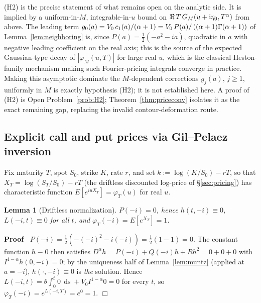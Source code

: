 \documentclass{article}
\newcommand{\assign}{:=}
\newcommand{\tmem}[1]{{\em #1\/}}
\newcommand{\tmop}[1]{\ensuremath{\operatorname{#1}}}
\newcommand{\tmtextup}[1]{\text{{\upshape{#1}}}}
\newenvironment{proof}{\noindent\textbf{Proof\ }}{\hspace*{\fill}$\Box$\medskip}
\newtheorem{lemma}{Lemma}
{\theorembodyfont{\rmfamily\small}\newtheorem{problem}{Problem}}
\begin{document}
\begin{remark}
  [Status of \tmtextup{(H2)}]\label{rem:H2} (H2) is the precise statement of
  what remains open on the analytic side. It is implied by a uniform-in-$M$,
  integrable-in-$u$ bound on $\Re \hspace{0.17em} T \hspace{0.17em} G_M (u +
  \mathrm{i} \eta_0, T^{\alpha})$ from above. The leading term $g_0 (a) = V_0
  \hspace{0.17em} c_1 (a) / (\alpha + 1) = V_0  \hspace{0.17em} P (a) /
  \left( (\alpha + 1) \Gamma (\alpha + 1) \right)$ of
  Lemma~\ref{lem:neighboring} is, since $P (a) = \tfrac{1}{2} (- a^2 - ia)$,
  quadratic in $a$ with negative leading coefficient on the real axis; this
  is the source of the expected Gaussian-type decay of $| \varphi_M (u, T) |$
  for large real $u$, which is the classical Heston-family mechanism making
  such Fourier-pricing integrals converge in practice. Making this
  asymptotic dominate the $M$-dependent corrections $g_j (a)$, $j \ge 1$,
  uniformly in $M$ is exactly hypothesis (H2); it is not established here.
  A proof of (H2) is Open Problem~\ref{prob:H2}; Theorem~\ref{thm:priceconv}
  isolates it as the exact remaining gap, replacing the invalid
  contour-deformation route.
\end{remark}

\subsection{Explicit call and put prices via Gil--Pelaez
inversion}\label{subsec:callput}

Fix maturity $T$, spot $S_0$, strike $K$, rate $r$, and set $k \assign \log
(K / S_0) - rT$, so that $X_T = \log (S_T / S_0) - rT$ (the driftless
discounted log-price of \S\ref{sec:pricing}) has characteristic function
$E [e^{iuX_T}] = \varphi_T (u)$ for real $u$.

\begin{lemma}
  [Driftless normalization]\label{lem:driftless} $P (- i) = 0$, hence $h (t,
  - i) \equiv 0$, $L (- i, t) \equiv 0$ for all $t$, and $\varphi_T (- i) = E
  [e^{X_T}] = 1$.
\end{lemma}

\begin{proof}
  $P (- i) = \tfrac{1}{2} \left( - (- i)^2 - i (- i) \right) = \tfrac{1}{2} (1
  - 1) = 0$. The constant function $h \equiv 0$ then satisfies $D^{\alpha} h =
  P (- i) + Q (- i) h + R h^2 = 0 + 0 + 0$ with $I^{1 - \alpha} h (0, - i) =
  0$; by the uniqueness half of Lemma~\ref{lem:muntz} (applied at $a = -
  i$), $h (\cdot, - i) \equiv 0$ is {\tmem{the}} solution. Hence $L (- i, t) =
  \theta \int_0^t 0 \, \tmop{ds} + V_0 I^{1 - \alpha} 0 = 0$ for every $t$,
  so $\varphi_T (- i) = e^{L (- i, T)} = e^0 = 1$.
\end{proof}
\end{document}
